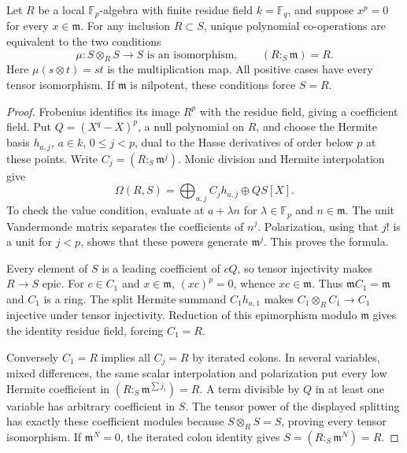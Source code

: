 \begin{theorem}\label{thm:bounded-p-nilpotence}
Let $R$ be a local $\mathbb F_p$-algebra with finite residue field
$k=\mathbb F_q$, and suppose $x^p=0$ for every $x\in\mathfrak m$.
For any inclusion $R\subset S$, unique polynomial co-operations
are equivalent to the two conditions
\[
                 \mu:S\otimes_R S\longrightarrow S
                       \text{ is an isomorphism},
                 \qquad(R:_S\mathfrak m)=R.
\]
Here $\mu(s\otimes t)=st$ is the multiplication map.
All positive cases have every tensor isomorphism. If
$\mathfrak m$ is nilpotent, these conditions force $S=R$.
\end{theorem}
\begin{proof}
Frobenius identifies its image $R^p$ with the residue field,
giving a coefficient field. Put $Q=(X^q-X)^p$, a null polynomial
on $R$, and choose the Hermite basis $h_{a,j}$, $a\in k$, $0\le j<p$,
dual to the Hasse derivatives of order below $p$ at these points.
Write $C_j=(R:_S\mathfrak m^j)$. Monic division and Hermite
interpolation give
\[
                     \Omega(R,S)=\bigoplus_{a,j}C_jh_{a,j}
                                      \oplus Q S[X].
\]
To check the value condition, evaluate at $a+\lambda n$ for
$\lambda\in\mathbb F_p$ and $n\in\mathfrak m$. The unit
Vandermonde matrix separates the coefficients of $n^j$.
Polarization, using that $j!$ is a unit for $j<p$, shows that
these powers generate $\mathfrak m^j$. This proves the formula.

Every element of $S$ is a leading coefficient of $cQ$, so tensor
injectivity makes $R\to S$ epic. For $c\in C_1$ and $x\in\mathfrak m$,
$(xc)^p=0$, whence $xc\in\mathfrak m$. Thus $\mathfrak mC_1=\mathfrak m$
and $C_1$ is a ring. The split Hermite summand $C_1h_{a,1}$ makes
$C_1\otimes_R C_1\to C_1$ injective under tensor injectivity.
Reduction of this epimorphism modulo $\mathfrak m$ gives the
identity residue field, forcing $C_1=R$.

Conversely $C_1=R$ implies all $C_j=R$ by iterated colons.
In several variables, mixed differences, the same scalar
interpolation and polarization put every low Hermite coefficient
in $(R:_S\mathfrak m^{\sum j_i})=R$. A term divisible by $Q$ in
at least one variable has arbitrary coefficient in $S$. The tensor
power of the displayed splitting has exactly these coefficient
modules because $S\otimes_R S=S$, proving every tensor
isomorphism. If $\mathfrak m^N=0$, the iterated colon identity
gives $S=(R:_S\mathfrak m^N)=R$.
\end{proof}
